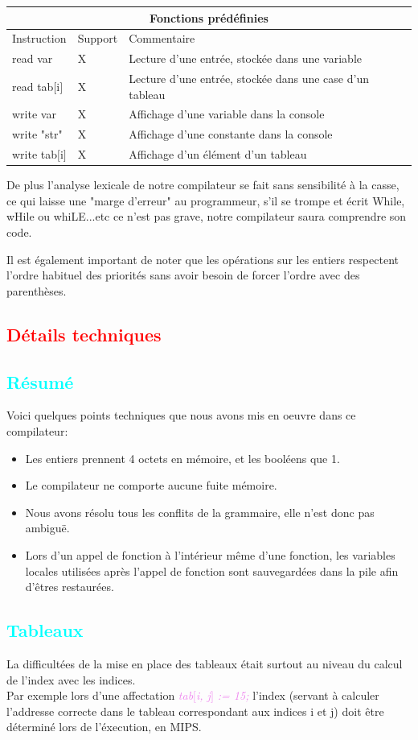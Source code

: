 \documentclass[a4paper]{article}
\let\oldtextit\textit
\renewcommand{\textit}[1]{\textcolor{violet}{\oldtextit{#1}}}
\newcommand{\csection}[1]{\textcolor{red}{\section{#1}}}
\newcommand{\csubsection}[1]{\textcolor{cyan}{\subsection{#1}}}
\begin{document}
\begin{center}
\begin{tabular}{|l|l|l|}
  \hline
  \multicolumn{3}{|c|}{Fonctions prédéfinies} \\
  \hline
  Instruction & Support & Commentaire \\
  \hline
  read var & X & Lecture d'une entrée, stockée dans une variable \\
  read tab$[$i$]$ & X & Lecture d'une entrée, stockée dans une case d'un tableau \\
  write var & X & Affichage d'une variable dans la console \\
  write "str" & X & Affichage d'une constante dans la console \\
  write tab$[$i$]$ & X & Affichage d'un élément d'un tableau \\
  \hline
\end{tabular}

\end{center}

De plus l'analyse lexicale de notre compilateur se fait sans sensibilité à la casse, ce qui laisse une "marge d'erreur" au programmeur, s'il se trompe et écrit While, wHile ou whiLE...etc ce n'est pas grave, notre compilateur saura comprendre son code.

Il est également important de noter que les opérations sur les entiers respectent l'ordre habituel des priorités sans avoir besoin de forcer l'ordre avec des parenthèses.

\clearpage

\csection{Détails techniques}

\csubsection{Résumé}

Voici quelques points techniques que nous avons mis en oeuvre dans ce compilateur:
\begin{itemize}
    \item Les entiers prennent 4 octets en mémoire, et les booléens que 1.
    \item Le compilateur ne comporte aucune fuite mémoire.
    \item Nous avons résolu tous les conflits de la grammaire, elle n'est donc pas ambiguë.
    \item Lors d'un appel de fonction à l'intérieur même d'une fonction, les variables locales utilisées après l'appel de fonction sont sauvegardées dans la pile afin d'êtres restaurées.
\end{itemize}

\csubsection{Tableaux}

La difficultées de la mise en place des tableaux était surtout au niveau du calcul de l'index avec les indices.\\
Par exemple lors d'une affectation \textit{tab$[$i, j$]$ := 15;} l'index (servant à calculer l'addresse correcte dans le tableau correspondant aux indices i et j) doit être déterminé lors de l'éxecution, en MIPS.
\end{document}
